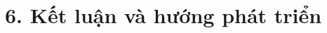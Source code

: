 \documentclass[../main.tex]{subfiles}
\begin{document}
\section{6. Kết luận và hướng phát triển}

\end{document}
